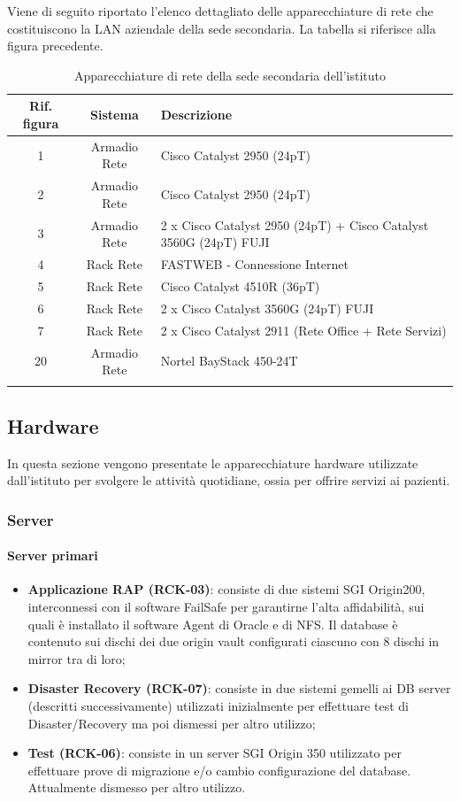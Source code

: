 \documentclass[12pt, a4paper, titlepage]{report}
\newcommand{\myparagraph}[1]{\paragraph{#1}\mbox{} \mbox{}}
\begin{document}
		Viene di seguito riportato l'elenco dettagliato delle apparecchiature di rete che costituiscono la LAN aziendale della sede secondaria. La tabella si riferisce alla figura precedente.
		
		\begin{longtable}{| c | c | p{6cm} |}
				\hline
				\textbf{Rif. figura} & \textbf{Sistema} & \textbf{Descrizione} \\ \hline
				1 & Armadio Rete & Cisco Catalyst 2950 (24pT)\\ \hline
				2 & Armadio Rete & Cisco Catalyst 2950 (24pT)\\ \hline
				3 & Armadio Rete & 2 x Cisco Catalyst 2950 (24pT) + Cisco Catalyst 3560G (24pT) FUJI\\ \hline
				4 & Rack Rete & FASTWEB - Connessione Internet\\ \hline
				5 & Rack Rete & Cisco Catalyst 4510R (36pT)\\ \hline
				6 & Rack Rete & 2 x Cisco Catalyst 3560G (24pT) FUJI\\ \hline
				7 & Rack Rete & 2 x Cisco Catalyst 2911 (Rete Office + Rete Servizi)\\ \hline
				20 & Armadio Rete & Nortel BayStack 450-24T\\ \hline
				\caption{Apparecchiature di rete della sede secondaria dell'istituto}
		\end{longtable}
		
		\subsection{Hardware} \label{hardware}
		
		In questa sezione vengono presentate le apparecchiature hardware utilizzate dall'istituto per svolgere le attività quotidiane, ossia per offrire servizi ai pazienti.
		\subsubsection{Server}
		\myparagraph{Server primari}
		
		\begin{itemize}
			\item \textbf{Applicazione RAP (RCK-03)}: consiste di due sistemi SGI Origin200, interconnessi con il software FailSafe per garantirne l'alta affidabilità, sui quali è installato il software Agent di Oracle e di NFS. Il database è contenuto sui dischi dei due origin vault configurati ciascuno con 8 dischi in mirror tra di loro;
			\item \textbf{Disaster Recovery (RCK-07)}: consiste in due sistemi gemelli ai DB server (descritti successivamente) utilizzati inizialmente per effettuare test di Disaster/Recovery ma poi dismessi per altro utilizzo;
			\item \textbf{Test (RCK-06)}: consiste in un server SGI Origin 350 utilizzato per effettuare prove di migrazione e/o cambio configurazione del database. Attualmente dismesso per altro utilizzo.
		\end{itemize}
		
\end{document}
